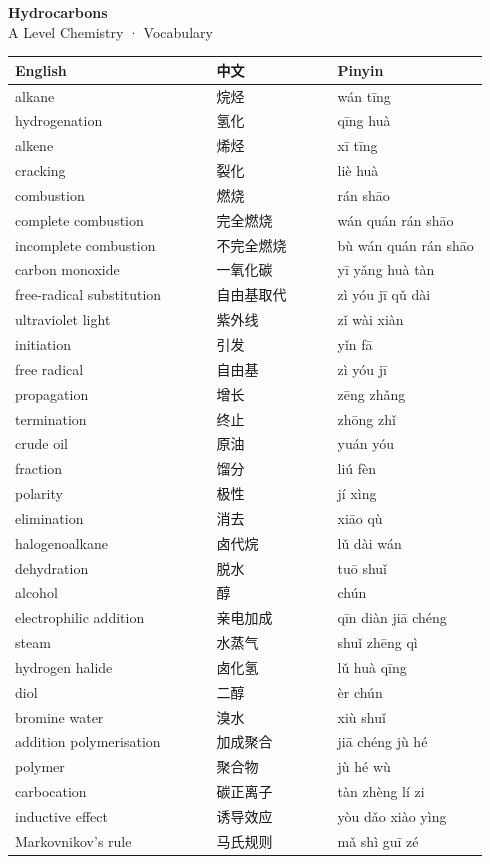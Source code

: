 \documentclass[11pt]{article}
\begin{document}
\begin{center}
  {\LARGE\bfseries Hydrocarbons}\\[0.35em]
  {\large A Level Chemistry · Vocabulary}
\end{center}
\vspace{0.6em}

\begin{longtable}{@{}p{0.40\linewidth}p{0.24\linewidth}p{0.30\linewidth}@{}}
\toprule
\textbf{English} & \textbf{中文} & \textbf{Pinyin} \\
\midrule
\endhead
\bottomrule
\endlastfoot
alkane & 烷烃 & wán tīng \\
hydrogenation & 氢化 & qīng huà \\
alkene & 烯烃 & xī tīng \\
cracking & 裂化 & liè huà \\
combustion & 燃烧 & rán shāo \\
complete combustion & 完全燃烧 & wán quán rán shāo \\
incomplete combustion & 不完全燃烧 & bù wán quán rán shāo \\
carbon monoxide & 一氧化碳 & yī yǎng huà tàn \\
free-radical substitution & 自由基取代 & zì yóu jī qǔ dài \\
ultraviolet light & 紫外线 & zǐ wài xiàn \\
initiation & 引发 & yǐn fā \\
free radical & 自由基 & zì yóu jī \\
propagation & 增长 & zēng zhǎng \\
termination & 终止 & zhōng zhǐ \\
crude oil & 原油 & yuán yóu \\
fraction & 馏分 & liú fèn \\
polarity & 极性 & jí xìng \\
elimination & 消去 & xiāo qù \\
halogenoalkane & 卤代烷 & lǔ dài wán \\
dehydration & 脱水 & tuō shuǐ \\
alcohol & 醇 & chún \\
electrophilic addition & 亲电加成 & qīn diàn jiā chéng \\
steam & 水蒸气 & shuǐ zhēng qì \\
hydrogen halide & 卤化氢 & lǔ huà qīng \\
diol & 二醇 & èr chún \\
bromine water & 溴水 & xiù shuǐ \\
addition polymerisation & 加成聚合 & jiā chéng jù hé \\
polymer & 聚合物 & jù hé wù \\
carbocation & 碳正离子 & tàn zhèng lí zi \\
inductive effect & 诱导效应 & yòu dǎo xiào yìng \\
Markovnikov's rule & 马氏规则 & mǎ shì guī zé \\
\end{longtable}
\end{document}
